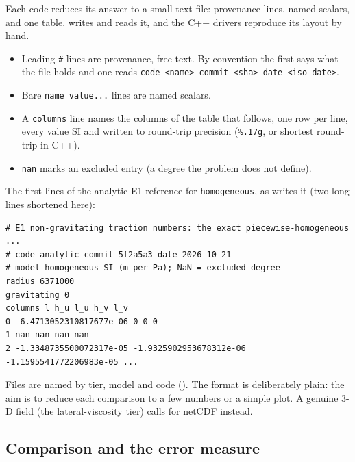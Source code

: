 \documentclass[11pt]{article}
\numberwithin{equation}{section}
\newcommand{\code}[1]{\texttt{#1}}
\begin{document}
Each code reduces its answer to a small text file: provenance lines, named
scalars, and one table.  writes and
reads it, and the C++ drivers reproduce its layout by hand.
\begin{itemize}[leftmargin=*]
\item Leading \code{\#} lines are provenance, free text. By convention the
  first says what the file holds and one reads \code{code <name> commit
  <sha> date <iso-date>}.
\item Bare \code{name value...} lines are named scalars.
\item A \code{columns} line names the columns of the table that follows,
  one row per line, every value SI and written to round-trip precision
  (\code{\%.17g}, or shortest round-trip in C++).
\item \code{nan} marks an excluded entry (a degree the problem does not
  define).
\end{itemize}
The first lines of the analytic E1 reference for \code{homogeneous}, as
 writes it (two long lines shortened here):
\begin{verbatim}
# E1 non-gravitating traction numbers: the exact piecewise-homogeneous ...
# code analytic commit 5f2a5a3 date 2026-10-21
# model homogeneous SI (m per Pa); NaN = excluded degree
radius 6371000
gravitating 0
columns l h_u l_u h_v l_v
0 -6.4713052310817677e-06 0 0 0
1 nan nan nan nan
2 -1.3348735500072317e-05 -1.9325902953678312e-06 -1.1595541772206983e-05 ...
\end{verbatim}
Files are named by tier, model and code (). The
format is deliberately plain: the aim is to reduce each comparison to a few
numbers or a simple plot. A genuine 3-D field (the lateral-viscosity tier)
calls for netCDF instead.

\subsection{Comparison and the error measure}
\label{sec:measure}
\end{document}
